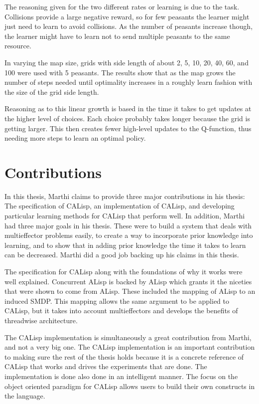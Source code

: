 \documentclass[jair,twoside,11pt,theapa]{article}
\begin{document}
The reasoning given for the two different rates or learning is due to the task. Collisions provide a large negative reward, so for few peasants the learner might just need to learn to avoid collisions. As the number of peasants increase though, the learner might have to learn not to send multiple peasants to the same resource. 

In varying the map size, grids with side length of about 2, 5, 10, 20, 40, 60, and 100 were used with 5 peasants. The results show that as the map grows the number of steps needed until optimality increases in a roughly learn fashion with the size of the grid side length.

Reasoning as to this linear growth is based in the time it takes to get updates at the higher level of choices. Each choice probably takes longer because the grid is getting larger. This then creates fewer high-level updates to the Q-function, thus needing more steps to learn an optimal policy.

\section{Contributions}
\label{Contribs}
In this thesis, Marthi claims to provide three major contributions in his thesis: The specification of CALisp, an implementation of CALisp, and developing particular learning methods for CALisp that perform well. In addition, Marthi had three major goals in his thesis. These were to build a system that deals with multieffector problems easily, to create a way to incorporate prior knowledge into learning, and to show that in adding prior knowledge the time it takes to learn can be decreased. Marthi did a good job backing up his claims in this thesis. 

The specification for CALisp along with the foundations of why it works were well explained. Concurrent ALisp is backed by ALisp which grants it the niceties that were shown to come from ALisp. These included the mapping of ALisp to an induced SMDP. This mapping allows the same argument to be applied to CALisp, but it takes into account multieffectors and develops the benefits of threadwise architecture. 

The CALisp implementation is simultaneously a great contribution from Marthi, and not a very big one. The CALisp implementation is an important contribution to making sure the rest of the thesis holds because it is a concrete reference of CALisp that works and drives the experiments that are done. The implementation is done also done in an intelligent manner. The focus on the object oriented paradigm for CALisp allows users to build their own constructs in the language. 
\end{document}

